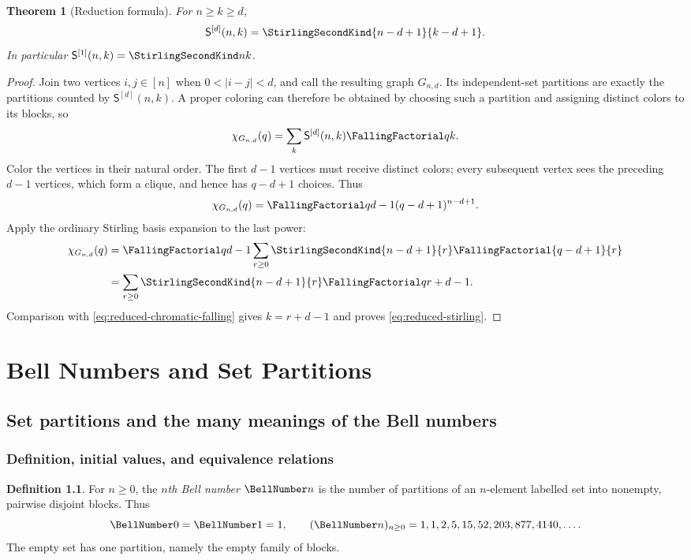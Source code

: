 \documentclass[11pt,a4paper,oneside,openany]{book}
\newtheorem{theorem}{Theorem}[chapter]
\theoremstyle{definition}
\newtheorem{definition}[theorem]{Definition}
\theoremstyle{remark}
\begin{document}
\begin{theorem}[Reduction formula]
\label{thm:reduced-stirling}
For $n\ge k\ge d$,
\begin{equation}
\label{eq:reduced-stirling}
 \mathsf S^{[d]}(n,k)=\StirlingSecondKind{n-d+1}{k-d+1}.
\end{equation}
In particular $\mathsf S^{[1]}(n,k)=\StirlingSecondKind nk$.
\end{theorem}
\begin{proof}
Join two vertices $i,j\in[n]$ when $0<|i-j|<d$, and call the resulting graph
$G_{n,d}$.  Its independent-set partitions are exactly the partitions counted by
$\mathsf S^{[d]}(n,k)$.  A proper coloring can therefore be obtained by choosing
such a partition and assigning distinct colors to its blocks, so
\begin{equation}
\label{eq:reduced-chromatic-falling}
 \chi_{G_{n,d}}(q)=\sum_k\mathsf S^{[d]}(n,k)\FallingFactorial qk.
\end{equation}
Color the vertices in their natural order.  The first $d-1$ vertices must receive
distinct colors; every subsequent vertex sees the preceding $d-1$ vertices, which
form a clique, and hence has $q-d+1$ choices.  Thus
\[
 \chi_{G_{n,d}}(q)
 =\FallingFactorial q{d-1}(q-d+1)^{n-d+1}.
\]
Apply the ordinary Stirling basis expansion to the last power:
\begin{align*}
 \chi_{G_{n,d}}(q)
 &=\FallingFactorial q{d-1}
   \sum_{r\ge0}\StirlingSecondKind{n-d+1}{r}\FallingFactorial{q-d+1}{r}\\
 &=\sum_{r\ge0}\StirlingSecondKind{n-d+1}{r}\FallingFactorial q{r+d-1}.
\end{align*}
Comparison with \eqref{eq:reduced-chromatic-falling} gives
$k=r+d-1$ and proves \eqref{eq:reduced-stirling}.
\end{proof}
\part{Bell Numbers and Set Partitions}

\chapter{Set partitions and the many meanings of the Bell numbers}

\section{Definition, initial values, and equivalence relations}
\begin{definition}
For $n\ge0$, the \emph{$n$th Bell number} $\BellNumber n$ is the number of partitions of
an $n$-element labelled set into nonempty, pairwise disjoint blocks.  Thus
\[
 \BellNumber0=\BellNumber1=1,
 \qquad
 (\BellNumber n)_{n\ge0}=1,1,2,5,15,52,203,877,4140,\ldots .
\]
The empty set has one partition, namely the empty family of blocks.
\end{definition}
\end{document}
